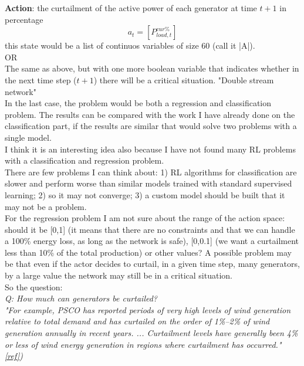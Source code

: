 \noindent\textbf{Action}: the curtailment of the active power of each generator at time $t+1$ in percentage
\[
a_t = [P^{cur\%}_{load,t}]
\]
\noindent this state would be a list of continuos variables of size 60 (call it |A|). \\
OR \\
The same as above, but with one more boolean variable that indicates whether in the next time step ($t+1$) there will be a critical situation. "Double stream network"\\

In the last case, the problem would be both a regression and classification problem. The results can be compared with the work I have already done on the classification part, if the results are similar that would solve two problems with a single model.\\
I think it is an interesting idea also because I have not found many RL problems with a classification and regression problem. \\

There are few problems I can think about: 1) RL algorithms for classification are slower and perform worse than similar models trained with standard supervised learning; 2) so it may not converge; 3) a custom model should be built that it may not be a problem.\\

For the regression problem I am not sure about the range of the action space: should it be [0,1] (it means that there are no constraints and that we can handle a 100\% energy loss, as long as the network is safe), [0,0.1] (we want a curtailment less than 10\% of the total production) or other values? A possible problem may be that even if the actor decides to curtail, in a given time step, many generators, by a large value the network may still be in a critical situation. \\

So the question:\\
\emph{Q: How much can generators be curtailed? \\ "For example, PSCO has reported periods of very high levels of wind generation relative to total demand and has curtailed on the order of 1\%–2\% of wind generation annually in recent years. ...  Curtailment levels have generally been 4\% or less of wind energy generation in regions where curtailment has occurred." \href{https://www.nrel.gov/docs/fy14osti/60983.pdf}{[ref]}) }\\

